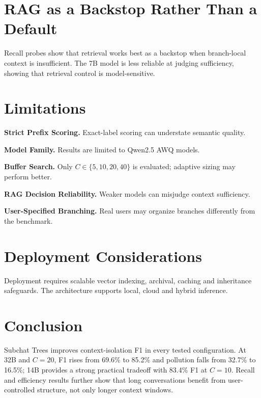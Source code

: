 \section{RAG as a Backstop Rather Than a Default}\label{subsec:rag_backstop_discussion}

Recall probes show that retrieval works best as a backstop when branch-local context is insufficient. The 7B model is less reliable at judging sufficiency, showing that retrieval control is model-sensitive.

\section{Limitations}\label{subsec:limitations}

\textbf{Strict Prefix Scoring.} Exact-label scoring can understate semantic quality.

\textbf{Model Family.} Results are limited to Qwen2.5 AWQ models.

\textbf{Buffer Search.} Only $C \in \{5,10,20,40\}$ is evaluated; adaptive sizing may perform better.

\textbf{RAG Decision Reliability.} Weaker models can misjudge context sufficiency.

\textbf{User-Specified Branching.} Real users may organize branches differently from the benchmark.

\section{Deployment Considerations}\label{subsec:deployment}

Deployment requires scalable vector indexing, archival, caching and inheritance safeguards. The architecture supports local, cloud and hybrid inference.

\section{Conclusion}\label{sec6}
Subchat Trees improves context-isolation F1 in every tested configuration. At 32B and $C=20$, F1 rises from 69.6\% to 85.2\% and pollution falls from 32.7\% to 16.5\%; 14B provides a strong practical tradeoff with 83.4\% F1 at $C=10$. Recall and efficiency results further show that long conversations benefit from user-controlled structure, not only longer context windows.


